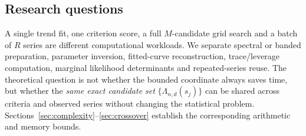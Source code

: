 \subsection{Research questions}
A single trend fit, one criterion score, a full $M$-candidate
grid search and a batch of $R$ series are different computational workloads.
We separate spectral or banded preparation, parameter inversion,
fitted-curve reconstruction, trace/leverage computation, marginal
likelihood determinants and repeated-series reuse. The theoretical
question is not whether the bounded coordinate always saves time,
but whether the \emph{same exact candidate set}
$\{\Lambda_{n,d}(s_j)\}$ can be shared across criteria
and observed series without changing the statistical problem.
Sections~\ref{sec:complexity}--\ref{sec:crossover} establish
the corresponding arithmetic and memory bounds.
